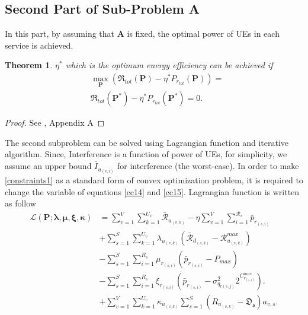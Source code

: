 \documentclass[conference]{IEEEtran}
\newtheorem{theorem}{Theorem}
\begin{document}
\subsection{Second Part of Sub-Problem A}\label{secondsub}
In this part, by assuming that $\boldsymbol{A}$ is fixed, the optimal power of UEs in each service is achieved.
\begin{theorem}\label{t2}
 $\eta^*$ which is the optimum energy efficiency can be achieved if
\begin{equation}\label{q2}
\begin{split}
&\max \limits_{\boldsymbol{P}} (\mathfrak{R}_{tot}(\boldsymbol{P}) - \eta^* P_{r_{tot}}(\boldsymbol{P}))=\\
& \mathfrak{R}_{tot}(\boldsymbol{P}^*) - \eta^* P_{r_{tot}}(\boldsymbol{P}^*) =0.
\end{split}
\end{equation}
\end{theorem}
\begin{proof}
See \cite{aaa}, Appendix A
\end{proof}
The second subproblem can  be solved using Lagrangian function and iterative algorithm. 
Since, Interference is a function of power of UEs, for simplicity, we assume an upper bound $\bar{I}_{u_{(v,i)}}$ for interference (the worst-case). 
In order to make \eqref{constraints1} as a standard form of convex optimization problem, it is required to change the variable of equations \eqref{cc14} and \eqref{cc15}.
Lagrangian function is written as follow
\begin{equation}\label{lagrang}
\begin{split}
\mathcal{L}(\boldsymbol{P}; \boldsymbol{\lambda}, \boldsymbol{\mu}, \boldsymbol{ \xi}, \boldsymbol{ \kappa}) & = \sum\limits_{v=1}^{V} \sum\limits_{k=1}^{U_v}\mathcal{\bar{R}}_{u_{(v,k)}} 
- \eta \sum\limits_{v=1}^{V} \sum\limits_{i=1}^{\mathcal{R}_s}\bar{p}_{r_{(s,i)}}\\
&+\sum\limits_{s=1}^{S} \sum\limits_{k=1}^{U_v} \lambda_{u_{(v,k)}} (\mathcal{\bar{R}}_{d_{(s,k)}}-\mathcal{R}_{u_{(v,k)}}^{max})\\
&- \sum\limits_{s=1}^{S} \sum\limits_{i=1}^{R_s} \mu_{r_{(s,i)}} (\bar{p}_{r_{(s,i)}}-P_{max})\\
&- \sum\limits_{s=1}^{S} \sum\limits_{i=1}^{R_s} \xi_{r_{(s,i)}} (\bar{p}_{r_{(s,i)}}-\sigma_{q_{r(s,j)}}^2 2^{C_{r_{(s,i)}}^{max}}).\\ 
&+ \sum\limits_{v=1}^{V} \sum\limits_{k=1}^{U_v} \kappa_{u_{(v,k)}} \sum\limits_{s=1}^{S}(R_{u_{(v,k)}} -\mathfrak{D_s})a_{v,s}.\\ 
\end{split}
\end{equation}
\end{document}
